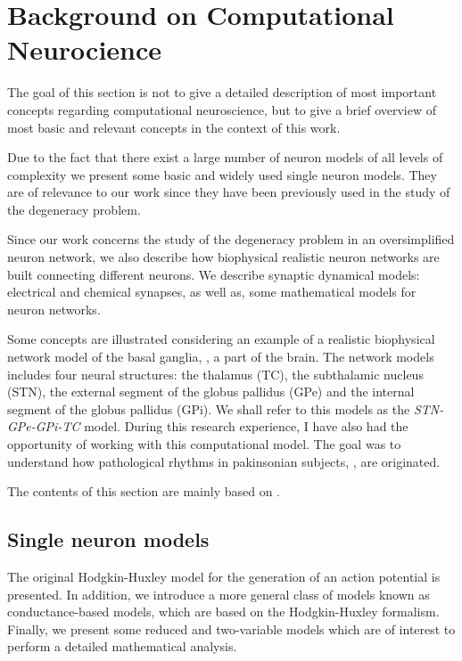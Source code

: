 \chapter{Background on Computational Neurocience}
\label{sec:back}

The goal of this section is not to give a detailed description of most important concepts regarding computational neuroscience, but to give a brief overview of most basic and relevant concepts in the context of this work.

Due to the fact that there exist a large number of neuron models of all levels of complexity we present some basic and widely used single neuron models. They are of relevance to our work since they have been previously used in the study of the degeneracy problem.

Since our work concerns the study of the degeneracy problem in an oversimplified neuron network, we also describe how biophysical realistic neuron networks are built connecting different neurons. We describe synaptic dynamical models: electrical and chemical synapses, as well as, some mathematical models for neuron networks.

Some concepts are illustrated considering an example of a realistic biophysical network model of the basal ganglia, \cite{Rubin2004}, a part of the brain. The network models includes four neural structures: the thalamus (TC), the subthalamic nucleus (STN), the external segment of the globus pallidus (GPe) and the internal segment of the globus pallidus (GPi). We shall refer to this models as the \textit{STN-GPe-GPi-TC} model. During this research experience, I have also had the opportunity of working with this computational model. The goal was to understand how pathological rhythms in pakinsonian subjects, \cite{Gillies2017}, are originated.

The contents of this section are mainly based on \cite{Volume2009,book1,Abbott1996,Herz2006,Lourens2013}.

\section{Single neuron models}
The original Hodgkin-Huxley model for the generation of an action potential is presented. In addition, we introduce a more general class of models known as conductance-based models, which are based on the Hodgkin-Huxley formalism. Finally, we present some reduced and two-variable models which are of interest to perform a detailed mathematical analysis.

